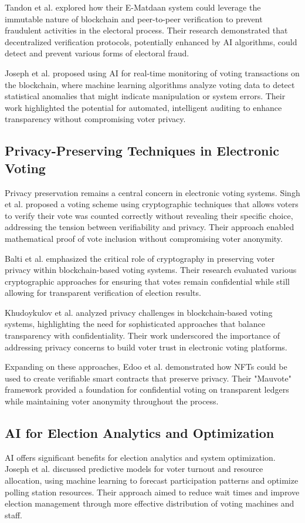 \documentclass[conference]{IEEEtran}
\begin{document}
Tandon et al. \cite{b3} explored how their E-Matdaan system could leverage the immutable nature of blockchain and peer-to-peer verification to prevent fraudulent activities in the electoral process. Their research demonstrated that decentralized verification protocols, potentially enhanced by AI algorithms, could detect and prevent various forms of electoral fraud.

Joseph et al. \cite{b6} proposed using AI for real-time monitoring of voting transactions on the blockchain, where machine learning algorithms analyze voting data to detect statistical anomalies that might indicate manipulation or system errors. Their work highlighted the potential for automated, intelligent auditing to enhance transparency without compromising voter privacy.

\subsection{Privacy-Preserving Techniques in Electronic Voting}
Privacy preservation remains a central concern in electronic voting systems. Singh et al. \cite{b5} proposed a voting scheme using cryptographic techniques that allows voters to verify their vote was counted correctly without revealing their specific choice, addressing the tension between verifiability and privacy. Their approach enabled mathematical proof of vote inclusion without compromising voter anonymity.

Balti et al. \cite{b2} emphasized the critical role of cryptography in preserving voter privacy within blockchain-based voting systems. Their research evaluated various cryptographic approaches for ensuring that votes remain confidential while still allowing for transparent verification of election results.

Khudoykulov et al. \cite{b1} analyzed privacy challenges in blockchain-based voting systems, highlighting the need for sophisticated approaches that balance transparency with confidentiality. Their work underscored the importance of addressing privacy concerns to build voter trust in electronic voting platforms.

Expanding on these approaches, Edoo et al. \cite{b7} demonstrated how NFTs could be used to create verifiable smart contracts that preserve privacy. Their "Mauvote" framework provided a foundation for confidential voting on transparent ledgers while maintaining voter anonymity throughout the process.

\subsection{AI for Election Analytics and Optimization}
AI offers significant benefits for election analytics and system optimization. Joseph et al. \cite{b6} discussed predictive models for voter turnout and resource allocation, using machine learning to forecast participation patterns and optimize polling station resources. Their approach aimed to reduce wait times and improve election management through more effective distribution of voting machines and staff.
\end{document}
